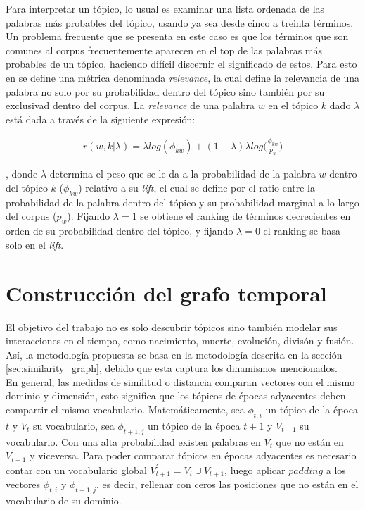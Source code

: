 Para interpretar un tópico, lo usual es examinar una lista ordenada de las palabras más probables del tópico, usando ya sea desde cinco a treinta términos. Un problema frecuente que se presenta en este caso es que los términos que son comunes al corpus frecuentemente aparecen en el top de las palabras más probables de un tópico, haciendo difícil discernir el significado de estos. Para esto en \citep{sievert2014ldavis} se define una métrica denominada \textit{relevance}, la cual define la relevancia de una palabra no solo por su probabilidad dentro del tópico sino también por su exclusivad dentro del corpus. La \textit{relevance} de una palabra $w$ en el tópico $k$ dado $\lambda$ está dada a través de la siguiente expresión:

\begin{align}
    r(w,k|\lambda) = \lambda log (\phi_{kw})+ (1-\lambda)\lambda log\bigg(\frac{\phi_{kw}}{p_{w}}\bigg)
\end{align}

, donde $\lambda$ determina el peso que se le da a la probabilidad de la palabra $w$ dentro del tópico $k$ ($\phi_{kw}$) relativo a su \textit{lift}, el cual se define por el ratio entre la probabilidad de la palabra dentro del tópico y su probabilidad marginal a lo largo del corpus ($p_w$). Fijando $\lambda=1$ se obtiene el ranking de términos decrecientes en orden de su probabilidad dentro del tópico, y fijando $\lambda=0$ el ranking se basa solo en el \textit{lift}.

\section{Construcción del grafo temporal}
\label{sec:build_graph}

El objetivo del trabajo no es solo descubrir tópicos sino también modelar sus interacciones en el tiempo, como nacimiento, muerte, evolución, divisón y fusión.
Así, la metodología propuesta se basa en la metodología descrita en la sección \ref{sec:similarity_graph}, debido que esta captura los dinamismos mencionados.\\

En general, las medidas de similitud o distancia comparan vectores con el mismo dominio y dimensión, esto significa que los tópicos de épocas adyacentes deben compartir el mismo vocabulario. Matemáticamente, sea $\phi_{t, i}$ un tópico de la época $t$ y $V_{t}$ su vocabulario, sea  $\phi_{t+1, j}$ un tópico de la época $t+1$ y $V_{t+1}$ su vocabulario. Con una alta probabilidad existen palabras en $V_{t}$ que no están en $V_{t+1}$ y viceversa. Para poder comparar tópicos en épocas adyacentes  es necesario contar con un vocabulario global $V_{t+1}^{'}=V_{t}\cup V_{t+1}$, luego aplicar $padding$ a los vectores $\phi_{t, i}$ y $\phi_{t+1, j}$, es decir, rellenar con ceros las posiciones que no están en el vocabulario de su dominio.\\

